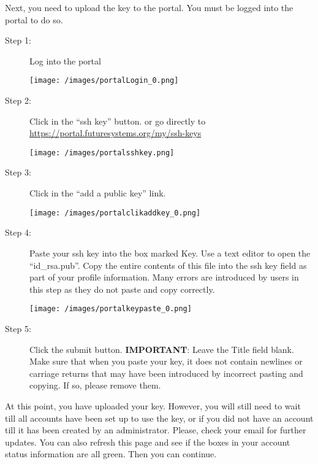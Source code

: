 Next, you need to upload the key to the portal. You must be logged into
the portal to do so.

\begin{description}

\item[Step 1:] Log into the portal \medskip

\begin{center}
\texttt{[image: /images/portalLogin\_0.png]}
\end{center}

\item[Step 2:] Click in the ``ssh key'' button. or go directly to
  \url{https://portal.futuresystems.org/my/ssh-keys} \medskip

\begin{center}
\texttt{[image: /images/portalsshkey.png]}
\end{center}

\item[Step 3:] Click in the ``add a public key'' link.  \medskip

\begin{center}
\texttt{[image: /images/portalclikaddkey\_0.png]}
\end{center}

\item[Step 4:] Paste your ssh key into the box marked Key. Use a text
  editor to open the ``id\_rsa.pub''. Copy the entire contents of this
  file into the ssh key field as part of your profile
  information. Many errors are introduced by users in this step as
  they do not paste and copy correctly.  \medskip

\begin{center}
\texttt{[image: /images/portalkeypaste\_0.png]}
\end{center}

\item[Step 5:] Click the submit button. \textbf{IMPORTANT}: Leave the
  Title field blank.  Make sure that when you paste your key, it does
  not contain newlines or carriage returns that may have been
  introduced by incorrect pasting and copying. If so, please remove
  them.

\end{description}

At this point, you have uploaded your key. However, you will still need
to wait till all accounts have been set up to use the key, or if you did
not have an account till it has been created by an administrator.
Please, check your email for further updates. You can also refresh this
page and see if the boxes in your account status information are all
green. Then you can continue.

